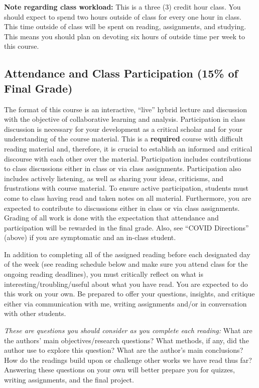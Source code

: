 \documentclass[11pt,]{article}
\begin{document}
\textbf{Note regarding class workload:} This is a three (3) credit hour
class. You should expect to spend two hours outside of class for every
one hour in class. This time outside of class will be spent on reading,
assignments, and studying. This means you should plan on devoting six
hours of outside time per week to this course.

\newpage

\hypertarget{attendance-and-class-participation-15-of-final-grade}{%
\subsection{Attendance and Class Participation (15\% of Final
Grade)}\label{attendance-and-class-participation-15-of-final-grade}}

The format of this course is an interactive, ``live'' hybrid lecture and
discussion with the objective of collaborative learning and analysis.
Participation in class discussion is necessary for your development as a
critical scholar and for your understanding of the course material. This
is a \textbf{required} course with difficult reading material and,
therefore, it is crucial to establish an informed and critical discourse
with each other over the material. Participation includes contributions
to class discussions either in class or via class assignments.
Participation also includes actively listening, as well as sharing your
ideas, criticisms, and frustrations with course material. To ensure
active participation, students must come to class having read and taken
notes on all material. Furthermore, you are expected to contribute to
discussions either in class or via class assignments. Grading of all
work is done with the expectation that attendance and participation will
be rewarded in the final grade. Also, see ``COVID Directions'' (above)
if you are symptomatic and an in-class student.

In addition to completing all of the assigned reading before each
designated day of the week (see reading schedule below and make sure you
attend class for the ongoing reading deadlines), you must critically
reflect on what is interesting/troubling/useful about what you have
read. You are expected to do this work on your own. Be prepared to offer
your questions, insights, and critique either via communication with me,
writing assignments and/or in conversation with other students.

\emph{These are questions you should consider as you complete each
reading:} What are the authors' main objectives/research questions? What
methods, if any, did the author use to explore this question? What are
the author's main conclusions? How do the readings build upon or
challenge other works we have read thus far? Answering these questions
on your own will better prepare you for quizzes, writing assignments,
and the final project.
\end{document}
